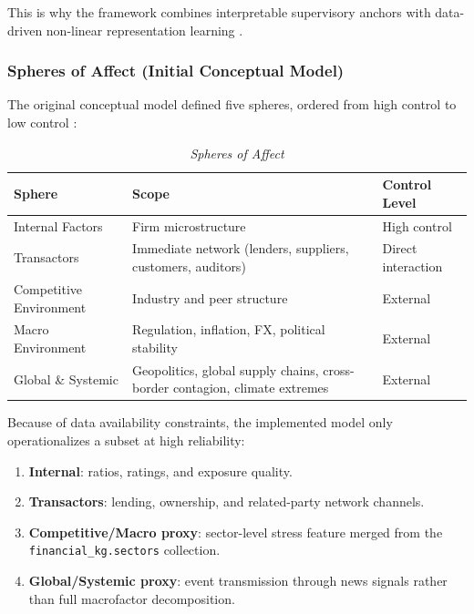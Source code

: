 This is why the framework combines interpretable supervisory anchors with data-driven non-linear representation learning \cite{ref28}.

\subsubsection{Spheres of Affect (Initial Conceptual Model)}

The original conceptual model defined five spheres, ordered from high control to low control \cite{ref28}:

\begin{table}[h]
\centering
\caption{\textit{Spheres of Affect}}
\vspace{0.5em}
\begin{tabular}{p{3.8cm}p{6.5cm}p{2.8cm}}
  \toprule
  Sphere & Scope & Control Level \\
  \midrule
  Internal Factors        & Firm microstructure                                                                      & High control       \\
  Transactors             & Immediate network (lenders, suppliers, customers, auditors)                     & Direct interaction \\
  Competitive Environment & Industry and peer structure                                                              & External            \\
  Macro Environment       & Regulation, inflation, FX, political stability                               & External            \\
  Global \& Systemic      & Geopolitics, global supply chains, cross-border contagion, climate extremes & External            \\
  \bottomrule
\end{tabular}
\end{table}

Because of data availability constraints, the implemented model only operationalizes a subset at high reliability:

\begin{enumerate}
  \item \textbf{Internal}: ratios, ratings, and exposure quality.
  \item \textbf{Transactors}: lending, ownership, and related-party network channels.
  \item \textbf{Competitive/Macro proxy}: sector-level stress feature merged from the \texttt{financial\_kg.sectors} collection.
  \item \textbf{Global/Systemic proxy}: event transmission through news signals rather than full macrofactor decomposition.
\end{enumerate}


